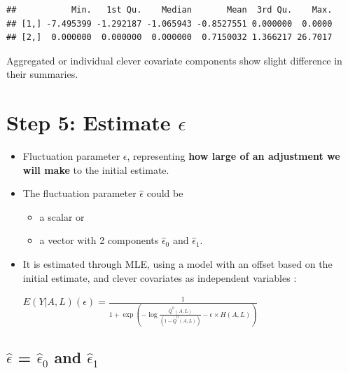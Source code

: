 \documentclass[
]{book}
\newenvironment{Shaded}{\begin{snugshade}}{\end{snugshade}}
\newcommand{\DecValTok}[1]{\textcolor[rgb]{0.00,0.00,0.81}{#1}}
\newcommand{\FunctionTok}[1]{\textcolor[rgb]{0.00,0.00,0.00}{#1}}
\newcommand{\NormalTok}[1]{#1}
\newcommand{\SpecialCharTok}[1]{\textcolor[rgb]{0.00,0.00,0.00}{#1}}
\providecommand{\tightlist}{%
  \setlength{\itemsep}{0pt}\setlength{\parskip}{0pt}}
\begin{document}
\begin{Shaded}
\end{Shaded}

\begin{verbatim}
##           Min.   1st Qu.    Median       Mean  3rd Qu.    Max.
## [1,] -7.495399 -1.292187 -1.065943 -0.8527551 0.000000  0.0000
## [2,]  0.000000  0.000000  0.000000  0.7150032 1.366217 26.7017
\end{verbatim}

Aggregated or individual clever covariate components show slight difference in their summaries.

\hypertarget{step-5-estimate-epsilon}{%
\section{\texorpdfstring{Step 5: Estimate \(\epsilon\)}{Step 5: Estimate \textbackslash epsilon}}\label{step-5-estimate-epsilon}}

\begin{itemize}
\item
  Fluctuation parameter \(\epsilon\), representing \textbf{how large of an adjustment we will make} to the initial estimate.
\item
  The fluctuation parameter \(\hat\epsilon\) could be

  \begin{itemize}
  \tightlist
  \item
    a scalar or
  \item
    a vector with 2 components \(\hat\epsilon_0\) and \(\hat\epsilon_1\).
  \end{itemize}
\item
  It is estimated through MLE, using a model with an offset based on the initial estimate, and clever covariates as independent variables \citep{gruber2009targeted}:

  \(E(Y|A,L)(\epsilon) = \frac{1}{1+\exp(-\log\frac{\bar Q^0(A,L)}{(1-\bar Q^0(A,L))}-\epsilon \times H(A,L))}\)
\end{itemize}

\hypertarget{hatepsilon-hatepsilon_0-and-hatepsilon_1}{%
\subsection{\texorpdfstring{\(\hat\epsilon\) = \(\hat\epsilon_0\) and \(\hat\epsilon_1\)}{\textbackslash hat\textbackslash epsilon = \textbackslash hat\textbackslash epsilon\_0 and \textbackslash hat\textbackslash epsilon\_1}}\label{hatepsilon-hatepsilon_0-and-hatepsilon_1}}
\end{document}
